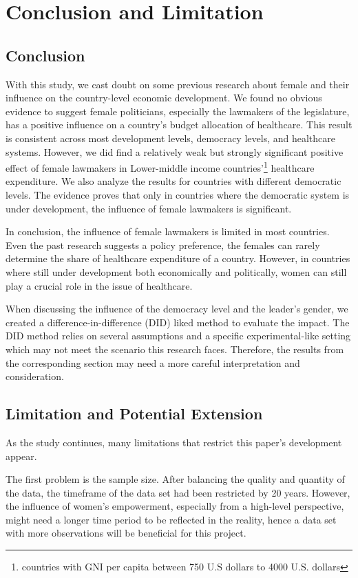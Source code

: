 \section{Conclusion and Limitation}
\label{Conclusion}
\subsection{Conclusion}

With this study, we cast doubt on some previous research about female and their influence on the country-level economic development.
We found no obvious evidence to suggest female politicians, especially the lawmakers of the legislature, has a positive influence on a country's budget allocation of healthcare.
This result is consistent across most development levels, democracy levels, and healthcare systems. However, we did find a relatively weak but strongly significant positive effect of female lawmakers in Lower-middle income countries'\footnote{countries with GNI per capita between 750 U.S dollars to 4000 U.S. dollars} healthcare expenditure.
We also analyze the results for countries with different democratic levels.
The evidence proves that only in countries where the democratic system is under development, the influence of female lawmakers is significant. 

In conclusion, the influence of female lawmakers is limited in most countries.
Even the past research suggests a policy preference, the females can rarely determine the share of healthcare expenditure of a country.
However, in countries where still under development both economically and politically, women can still play a crucial role in the issue of healthcare.

When discussing the influence of the democracy level and the leader's gender, we created a difference-in-difference (DID) liked method to evaluate the impact. 
The DID method relies on several assumptions and a specific experimental-like setting which may not meet the scenario this research faces. 
Therefore, the results from the corresponding section may need a more careful interpretation and consideration. 

\subsection{Limitation and Potential Extension}
As the study continues, many limitations that restrict this paper's development appear. 

The first problem is the sample size.
After balancing the quality and quantity of the data, the timeframe of the data set had been restricted by 20 years.
However, the influence of women's empowerment, especially from a high-level perspective, might need a longer time period to be reflected in the reality, hence a data set with more observations will be beneficial for this project.

